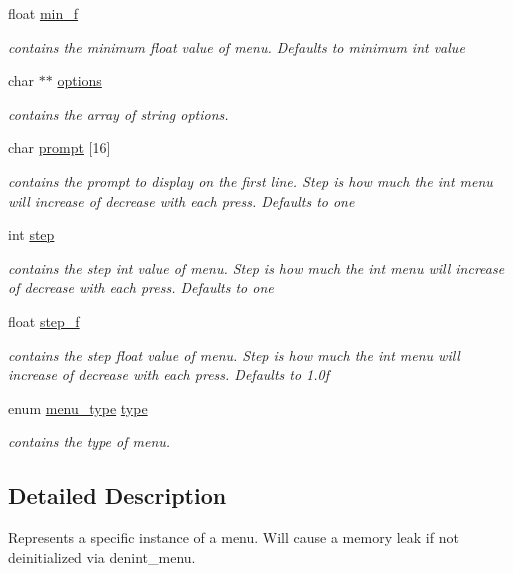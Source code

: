 \begin{DoxyCompactItemize}
float \hyperlink{structmenu__t_a0a6e4f711992fb69e8a57c2af1ab7a05}{min\+\_\+f}
\begin{DoxyCompactList}\small\item\em contains the minimum float value of menu. Defaults to minimum int value \end{DoxyCompactList}\item 
char $\ast$$\ast$ \hyperlink{structmenu__t_ad695cd88051e34817f0f582d4e43c33a}{options}
\begin{DoxyCompactList}\small\item\em contains the array of string options. \end{DoxyCompactList}\item 
char \hyperlink{structmenu__t_a5e3af2830962c2bbcb0a983f2c040c65}{prompt} \mbox{[}16\mbox{]}
\begin{DoxyCompactList}\small\item\em contains the prompt to display on the first line. Step is how much the int menu will increase of decrease with each press. Defaults to one \end{DoxyCompactList}\item 
int \hyperlink{structmenu__t_adc50450bc59ea66a8d67424adc46e24e}{step}
\begin{DoxyCompactList}\small\item\em contains the step int value of menu. Step is how much the int menu will increase of decrease with each press. Defaults to one \end{DoxyCompactList}\item 
float \hyperlink{structmenu__t_a84cfd9226f6554c63ca9f4b11f94d12d}{step\+\_\+f}
\begin{DoxyCompactList}\small\item\em contains the step float value of menu. Step is how much the int menu will increase of decrease with each press. Defaults to 1.\+0f \end{DoxyCompactList}\item 
enum \hyperlink{menu_8h_a6bbf4baf5018b0d76aab6c2e6bf85e62}{menu\+\_\+type} \hyperlink{structmenu__t_a110244ceb7d2a7cba95cfc5758d61c01}{type}
\begin{DoxyCompactList}\small\item\em contains the type of menu. \end{DoxyCompactList}\end{DoxyCompactItemize}


\subsection{Detailed Description}
Represents a specific instance of a menu. Will cause a memory leak if not deinitialized via denint\+\_\+menu. 

